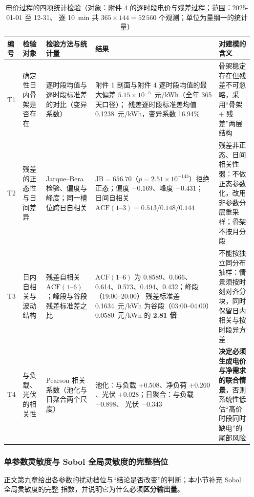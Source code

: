 \begin{table}[htbp]
  \centering
  \caption{电价过程的四项统计检验（对象：附件 4 的逐时段电价与残差过程；范围：2025-01-01 至 12-31、
            逐 10~min 共 \(365\times144=52\,560\) 个观测；单位为量纲一的统计量）}
  \label{tab:price-test}
  \footnotesize
  \setlength{\tabcolsep}{3pt}
  \begin{tabularx}{\linewidth}{C{0.62cm} L{1.85cm} L{4.35cm} L{3.35cm} Y}
    \toprule
    编号 & 检验对象 & 检验方法与统计量 & 结果 & 对建模的含义 \\
    \midrule
    T1 & 确定性日内骨架是否存在
      & 逐时段均值与逐时段标准差的对比（变异系数）
      & 附件 1 剖面与附件 4 逐时段均值的最大偏差 \(5.15\times10^{-5}\)~元/kWh（全年 365 天口径）；
        残差逐时段标准差均值 0.1238~元/kWh，变异系数 16.94\%
      & 骨架稳定存在但残差不可忽略，采用“骨架 \(+\) 残差”两层结构 \\
    T2 & 残差的正态性与日间差异
      & Jarque--Bera 检验、偏度与峰度；同一槽位跨日自相关
      & \(\mathrm{JB}=656.70\)（\(p=2.51\times10^{-143}\)）拒绝正态；偏度 \(-0.169\)、峰度 \(-0.431\)；
        日间自相关 \(\mathrm{ACF}(1\text{--}3)=0.513/0.148/0.144\)
      & 残差非正态、日间相关性弱：不做正态参数化，改用非参数分层重采样；骨架不按月分段 \\
    T3 & 日内自相关与波动结构
      & 残差自相关 \(\mathrm{ACF}(1\text{--}6)\)；峰段与谷段残差标准差之比
      & \(\mathrm{ACF}(1\text{--}6)\) 为 0.8589、0.666、0.614、0.573、0.494、0.432；峰段（19:00--20:00）
        残差标准差 0.1634~元/kWh 为谷段（03:00--04:00）0.0580~元/kWh 的 \textbf{2.81 倍}
      & 不能按独立同分布抽样：情景须按时刻对齐分块，同时保留日内相关与按时段异方差 \\
    T4 & 与负载、光伏的相关性
      & Pearson 相关系数（池化与日聚合两个尺度）
      & 池化：与负载 \(+0.508\)、净负荷 \(+0.260\)、光伏 \(+0.028\)；日聚合：与负载 \(+0.898\)、
        光伏 \(-0.343\)
      & \textbf{决定必须生成电价与净需求的联合情景}，否则系统性低估“高价时段同时缺电”的尾部风险 \\
    \bottomrule
  \end{tabularx}
\end{table}
\subsubsection{单参数灵敏度与 Sobol 全局灵敏度的完整档位}\label{sec:sens-app}

正文第九章给出各参数的扰动档位与“结论是否改变”的判断；本小节补充 Sobol 全局灵敏度的完整
指数，并说明它为什么必须\textbf{区分输出量}。

